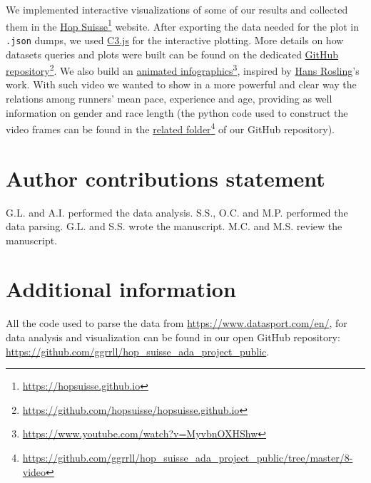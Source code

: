 \documentclass[fleqn,10pt]{wlscirep}
\begin{document}
		We implemented interactive visualizations of some of our results and collected  them in the   \href{https://hopsuisse.github.io}{Hop Suisse}\footnote{\url{https://hopsuisse.github.io}} website.
		After exporting the data needed for the plot in \texttt{.json} dumps, we used \href{http://c3js.org}{C3.js} for the interactive plotting. More details on how datasets queries and plots were built can be found on the dedicated \href{https://github.com/hopsuisse/hopsuisse.github.io}{GitHub repository}\footnote{\url{https://github.com/hopsuisse/hopsuisse.github.io}}.
		We also build an \href{https://www.youtube.com/watch?v=MyvbnOXHShw}{animated infographics}\footnote{\url{https://www.youtube.com/watch?v=MyvbnOXHShw}}, inspired by  \href{https://en.wikipedia.org/wiki/Hans_Rosling}{Hans Rosling}'s work. With such video we wanted to show in a more powerful and clear way the relations among runners' mean pace, experience and age, providing as well information on gender and race length
		(the python code used to construct the video frames can be found in the \href{https://github.com/ggrrll/hop_suisse_ada_project_public/tree/master/8-video}{related folder}\footnote{\url{https://github.com/ggrrll/hop_suisse_ada_project_public/tree/master/8-video}} of our GitHub repository).
	

%

\section*{Author contributions statement}

G.L. and A.I. performed the data analysis.
S.S., O.C. and M.P. performed the data parsing.
G.L. and S.S. wrote the manuscript.
M.C. and M.S. review the manuscript.

\section*{Additional information}

All the code used to parse the data from \url{https://www.datasport.com/en/}, for data analysis and visualization can be found in our open GitHub repository: \url{https://github.com/ggrrll/hop_suisse_ada_project_public}.\\
\end{document}
